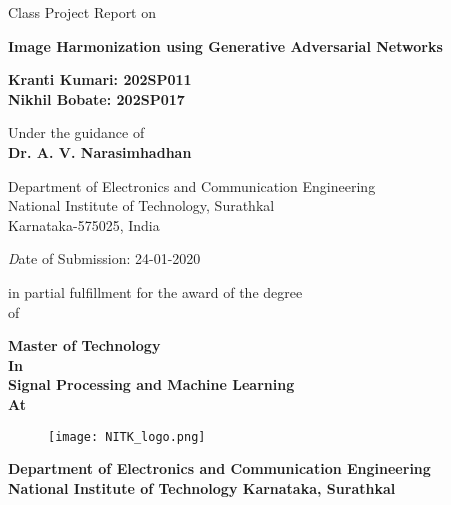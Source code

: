 \documentclass{article}
\title{}
\author{}
\date{}
\begin{document}
\begin{center}
Class Project Report on 
\end{center}

\begin{center}
\textbf{\huge Image Harmonization using Generative Adversarial Networks}
\end{center}

\begin{center}
\textbf{\large Kranti Kumari: 202SP011\\ Nikhil Bobate: 202SP017}
\end{center}

\begin{center}
Under the guidance of \\ {\textbf{\large Dr. A. V. Narasimhadhan}}
\end{center}

\begin{center}
\large Department of Electronics and Communication Engineering\\ National Institute of Technology, Surathkal\\  Karnataka-575025, India
\end{center}

\begin{center}
\emph Date of Submission: 24-01-2020
\end{center}

\begin{center}
in partial fulfillment for the award of the degree\\ of
\end{center}

\begin{center}
\textbf{\large Master of Technology\\ In\\ Signal Processing and Machine Learning\\ At}
\end{center}

\begin{figure}[htp]
    \centering
    \Large\texttt{[image: NITK\_logo.png]}
    \label{fig:logo1}
\end{figure}

\begin{center}
\textbf{\large Department of Electronics and Communication Engineering\\
National Institute of Technology Karnataka, Surathkal}
\end{center}
\end{document}

